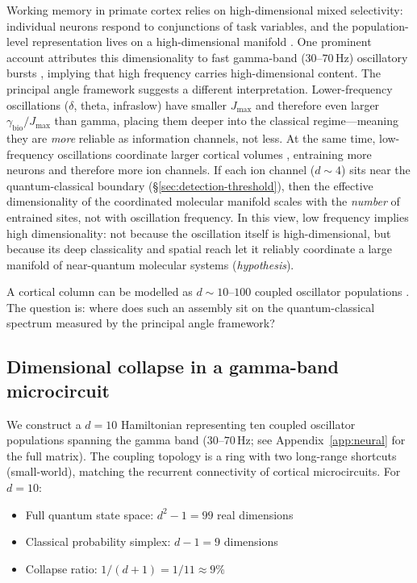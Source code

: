 \documentclass[12pt,a4paper]{article}
\theoremstyle{definition}
\theoremstyle{remark}
\begin{document}
Working memory in primate cortex relies on high-dimensional mixed selectivity: individual neurons respond to conjunctions of task variables, and the population-level representation lives on a high-dimensional manifold \cite{rigotti2013importance,fusi2016neurons}. One prominent account attributes this dimensionality to fast gamma-band ($30$--$70$\,Hz) oscillatory bursts \cite{lundqvist2016gamma,miller2018working,pinotsis2023cytoelectric}, implying that high frequency carries high-dimensional content. The principal angle framework suggests a different interpretation. Lower-frequency oscillations ($\delta$, theta, infraslow) have smaller $J_{\max}$ and therefore even larger $\gamma_{\mathrm{bio}}/J_{\max}$ than gamma, placing them deeper into the classical regime---meaning they are \emph{more} reliable as information channels, not less. At the same time, low-frequency oscillations coordinate larger cortical volumes \cite{buzsaki2012mechanisms}, entraining more neurons and therefore more ion channels. If each ion channel ($d \sim 4$) sits near the quantum-classical boundary (\S\ref{sec:detection-threshold}), then the effective dimensionality of the coordinated molecular manifold scales with the \emph{number} of entrained sites, not with oscillation frequency. In this view, low frequency implies high dimensionality: not because the oscillation itself is high-dimensional, but because its deep classicality and spatial reach let it reliably coordinate a large manifold of near-quantum molecular systems (\emph{hypothesis}).

A cortical column can be modelled as $d \sim 10$--$100$ coupled oscillator populations \cite{buzsaki2012mechanisms}. The question is: where does such an assembly sit on the quantum-classical spectrum measured by the principal angle framework?

\subsection{Dimensional collapse in a gamma-band microcircuit}
\label{sec:neural-collapse}

We construct a $d = 10$ Hamiltonian representing ten coupled oscillator populations spanning the gamma band ($30$--$70$\,Hz; see Appendix~\ref{app:neural} for the full matrix). The coupling topology is a ring with two long-range shortcuts (small-world), matching the recurrent connectivity of cortical microcircuits. For $d = 10$:
\begin{itemize}
\item Full quantum state space: $d^2 - 1 = 99$ real dimensions
\item Classical probability simplex: $d - 1 = 9$ dimensions
\item Collapse ratio: $1/(d+1) = 1/11 \approx 9\%$
\end{itemize}
\end{document}
